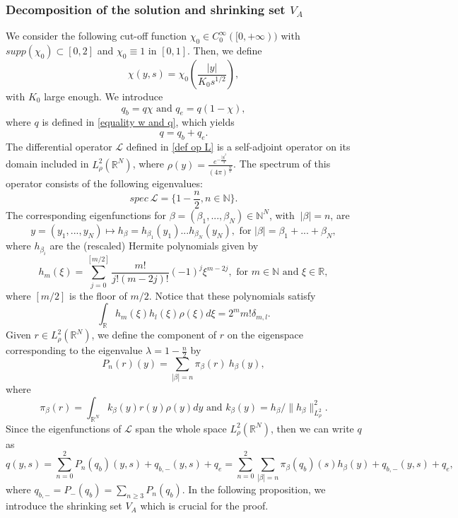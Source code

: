 \documentclass[11pt,a4paper]{article}
\newcommand{\1}{\mathbbm{1}}
\numberwithin{equation}{section}
\newcommand{\numberset}{\mathbb}
\newcommand{\N}{\numberset{N}}
\newcommand{\R}{\numberset{R}}
\theoremstyle{remark}
\begin{document}
\subsubsection{Decomposition of the solution and shrinking set $V_A$}
We consider the following cut-off function $\chi_0\in C^{\infty}_0([0,+\infty))$ with $supp(\chi_0)\subset [0,2]$ and $\chi_0\equiv 1$ in $[0,1]$. Then, we define
$$\chi(y,s)=\chi_0\left(\frac{|y|}{K_0s^{1/2}}\right),$$ with $K_0$ large enough. We introduce
\begin{equation}\label{def q_e, q_b}
q_b=q\chi \text{ and } q_e=q(1-\chi),
\end{equation}
where $q$ is defined in \eqref{equality w and q}, which yields
$$q=q_b+q_e.$$
The differential operator $\mathcal{L}$ defined in \eqref{def op L} is a self-adjoint operator on its domain included in $L^2_\rho(\R^N)$, where $\rho(y)= \frac{e^{-\frac{|y|^2}{4}}}{(4\pi)^{\frac{N}{2}}}$. The spectrum of this operator consists of the following eigenvalues:
$$spec\ \mathcal{L}=\{1-\frac{n}{2}, n\in \N\}.$$
The corresponding eigenfunctions for $\beta=(\beta_1,...,\beta_N)\in \N^N$, with $\ |\beta|=n$, are
$$y=(y_1,...,y_N)\mapsto h_\beta=h_{\beta_1}(y_1)...h_{\beta_N}(y_N), \text{ for } |\beta|=\beta_1+...+\beta_N,$$
where $h_{\beta_i}$ are the (rescaled) Hermite polynomials given by
\begin{equation}\label{defhm}
h_{m}(\xi)=\underset{j=0}{\overset{[m/2]}{\sum}}\frac{m!}{j!(m-2j)!}(-1)^j\xi^{m-2j}, \text{ for } m\in \N \text{ and } \xi\in \R,
\end{equation}
where $[m/2]$ is the floor of $m/2$. Notice that these polynomials satisfy 
\begin{equation}\label{orthogonality property}
\int_{\R}h_{m}(\xi)h_{l}(\xi)\rho(\xi) d\xi=2^{m}m!\delta_{m,l}.
\end{equation}
Given $r\in L^2_\rho(\R^N)$, we define the component of $r$ on the eigenspace corresponding to the eigenvalue $\lambda=1-\frac{n}{2}$ by
\begin{equation}\label{def projection Pn}
P_n (r)(y)=\underset{|\beta|=n}{\sum} \pi_\beta (r)\ h_\beta(y),
\end{equation}
where 
\begin{equation}\label{def q_beta and k_beta}
\pi_\beta(r)=\int_{\R^N} k_\beta(y)r(y)\rho(y) dy \text{ and }  k_\beta(y)=h_\beta/\|h_\beta\|_{L^2_\rho}^2.
\end{equation}
Since the eigenfunctions of $\mathcal{L}$ span the whole space $L^2_\rho(\R^N)$, then we can write $q$ as
\begin{equation}\label{decomposition r}
q(y,s)=\underset{n=0}{\overset{2}{\sum}}P_n(q_b)(y,s)+q_{b,-}(y,s)+q_e=\underset{n=0}{\overset{2}{\sum}}\underset{|\beta|=n}{\sum}\pi_\beta(q_b)(s)h_\beta(y)+q_{b,-}(y,s)+q_e,
\end{equation}
where $q_{b,-}=P_-(q_b)=\underset{n\geq 3}{\sum}P_n(q_b)$. In the following proposition, we introduce the shrinking set $V_A$ which is crucial for the proof.
\end{document}
